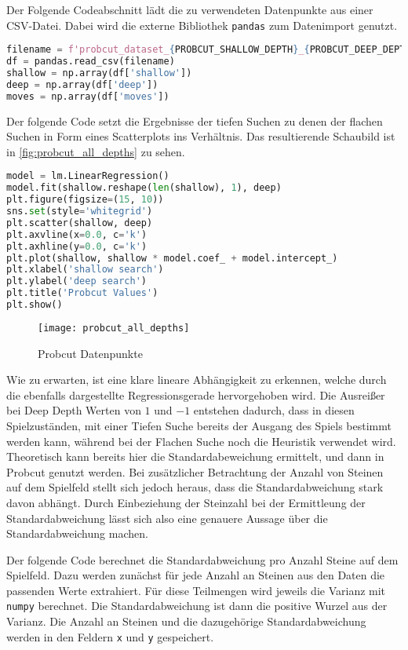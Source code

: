 Der Folgende Codeabschnitt lädt die zu verwendeten Datenpunkte aus einer
CSV-Datei. Dabei wird die externe Bibliothek
\passthrough{\lstinline!pandas!} zum Datenimport genutzt.

\begin{lstlisting}[language=Python]
filename = f'probcut_dataset_{PROBCUT_SHALLOW_DEPTH}_{PROBCUT_DEEP_DEPTH}.csv'
df = pandas.read_csv(filename)
shallow = np.array(df['shallow'])
deep = np.array(df['deep'])
moves = np.array(df['moves'])
\end{lstlisting}

Der folgende Code setzt die Ergebnisse der tiefen Suchen zu denen der
flachen Suchen in Form eines Scatterplots ins Verhältnis. Das
resultierende Schaubild ist in \autoref{fig:probcut_all_depths} zu
sehen.

\begin{lstlisting}[language=Python]
model = lm.LinearRegression()
model.fit(shallow.reshape(len(shallow), 1), deep)
plt.figure(figsize=(15, 10))
sns.set(style='whitegrid')
plt.scatter(shallow, deep)
plt.axvline(x=0.0, c='k')
plt.axhline(y=0.0, c='k')
plt.plot(shallow, shallow * model.coef_ + model.intercept_)
plt.xlabel('shallow search')
plt.ylabel('deep search')
plt.title('Probcut Values')
plt.show()
\end{lstlisting}

\begin{figure}[h]
    \centering
    \texttt{[image: probcut\_all\_depths]}
    \caption{Probcut Datenpunkte}
    \label{fig:probcut_all_depths}
\end{figure}

Wie zu erwarten, ist eine klare lineare Abhängigkeit zu erkennen, welche
durch die ebenfalls dargestellte Regressionsgerade hervorgehoben wird.
Die Ausreißer bei Deep Depth Werten von \(1\) und \(-1\) entstehen
dadurch, dass in diesen Spielzuständen, mit einer Tiefen Suche bereits
der Ausgang des Spiels bestimmt werden kann, während bei der Flachen
Suche noch die Heuristik verwendet wird. Theoretisch kann bereits hier
die Standardabeweichung ermittelt, und dann in Probcut genutzt werden.
Bei zusätzlicher Betrachtung der Anzahl von Steinen auf dem Spielfeld
stellt sich jedoch heraus, dass die Standardabweichung stark davon
abhängt. Durch Einbeziehung der Steinzahl bei der Ermittleung der
Standardabweichung lässt sich also eine genauere Aussage über die
Standardabweichung machen.

Der folgende Code berechnet die Standardabweichung pro Anzahl Steine auf
dem Spielfeld. Dazu werden zunächst für jede Anzahl an Steinen aus den
Daten die passenden Werte extrahiert. Für diese Teilmengen wird jeweils
die Varianz mit \passthrough{\lstinline!numpy!} berechnet. Die
Standardabweichung ist dann die positive Wurzel aus der Varianz. Die
Anzahl an Steinen und die dazugehörige Standardabweichung werden in den
Feldern \passthrough{\lstinline!x!} und \passthrough{\lstinline!y!}
gespeichert.

